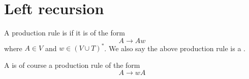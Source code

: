 \section{Left recursion}

A production rule is
if it is of the form
\[
A \rightarrow A w
\]
where $A \in V$ and $w \in (V \cup T)^*$.
We also say the above production rule is a
.

A 
is of course a production rule of the form
\[
A \rightarrow wA
\]
